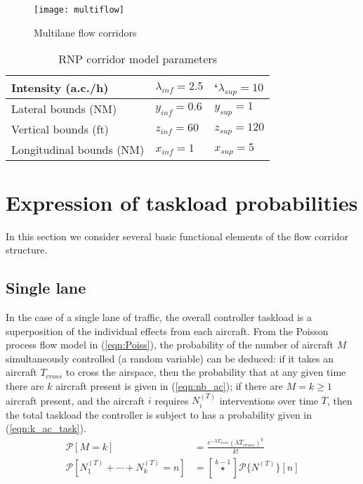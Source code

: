 \documentclass[conference]{IEEEtran}
\begin{document}
\begin{figure}[!h]
\centering
\texttt{[image: multiflow]}
\caption{Multilane flow corridors}
\label{fig:multiflow}
\end{figure}

\begin{table}
\caption{RNP corridor model parameters}
\label{tab:flow_param}
\centering
\begin{tabular}{|l|ll|}
\hline\hline
Intensity (a.c./h) 			& $\lambda_{inf}=2.5$  	&`$\lambda_{sup}=10$ \bigstrut\\ \hline
Lateral bounds (NM) 		& $y_{inf}=0.6$ 				& $y_{sup}=1$ \bigstrut \\ \hline
Vertical bounds (ft) 		& $z_{inf}=60$ 					& $z_{sup}=120$\bigstrut \\ \hline
Longitudinal bounds (NM)& $x_{inf}=1$ 					& $x_{sup}=5$ \bigstrut\\ \hline\hline
\end{tabular}
\end{table}

\section{Expression of taskload probabilities}
\label{sec:analytic}

In this section we consider several basic functional elements of the flow corridor structure.

\subsection{Single lane}
\label{sec:1lane}
In the case of a single lane of traffic, the overall controller taskload is a superposition of the individual effects from each aircraft. From the Poisson process flow model in (\ref{eqn:Poiss}), the probability of the number of aircraft $M$ simultaneously controlled (a random variable) can be deduced: if it takes an aircraft $T_{cross}$ to cross the airspace, then the probability that at any given time there are $k$ aircraft present is given in (\ref{eqn:nb_ac}); if there are $M=k\ge1$ aircraft present, and the aircraft $i$ requires $N_i^{(T)}$ interventions over time $T$, then the total taskload the controller is subject to has a probability given in (\ref{eqn:k_ac_task}).
\begin{align}
\mathcal P[M=k]&=\frac{e^{-\lambda T_{cross}}(\lambda T_{cross})^k}{k!}\label{eqn:nb_ac}\\
\mathcal P[N_1^{(T)}+\cdots+N_k^{(T)}=n]&= \left[\stackrel{k-1}{\star}\right]\mathcal P\{N^{(T)}\}[n]\label{eqn:k_ac_task}
\end{align}
\end{document}
